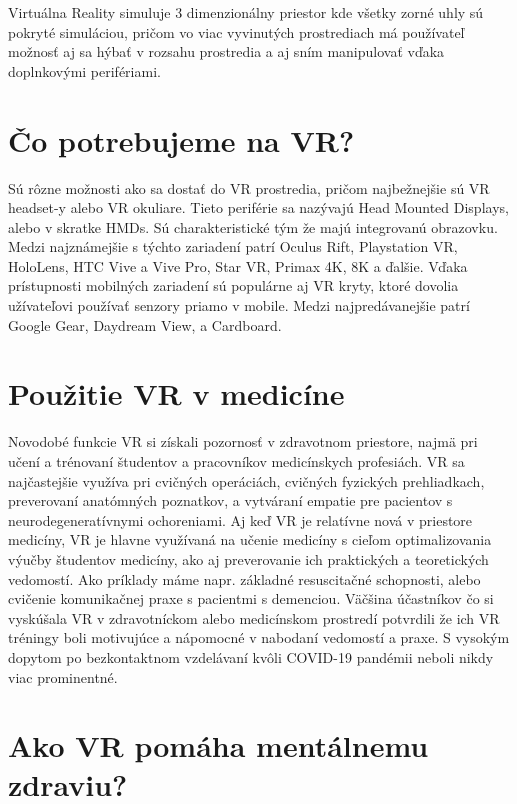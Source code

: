 \documentclass[10pt,twoside,slovak,a4paper]{article}
\begin{document}
Virtuálna Reality simuluje 3 dimenzionálny priestor kde všetky zorné uhly sú pokryté simuláciou, pričom vo viac vyvinutých prostrediach má používateľ možnosť aj sa hýbať v rozsahu prostredia a aj sním manipulovať vďaka doplnkovými perifériami.\cite{starkman}

\section{Čo potrebujeme na VR?} \label{Devices}

Sú rôzne možnosti ako sa dostať do VR prostredia, pričom najbežnejšie sú VR headset-y alebo VR okuliare.
Tieto periférie sa nazývajú Head Mounted Displays, alebo v skratke HMDs. Sú charakteristické tým že majú integrovanú obrazovku. Medzi najznámejšie s týchto zariadení patrí Oculus Rift, Playstation VR, HoloLens, HTC Vive a Vive Pro, Star VR, Primax 4K, 8K a ďalšie.
Vďaka prístupnosti mobilných zariadení sú populárne aj VR kryty, ktoré dovolia užívateľovi používať senzory priamo v mobile. Medzi najpredávanejšie patrí Google Gear, Daydream View, a Cardboard.

\section{Použitie VR v medicíne} \label{Usecase}

Novodobé funkcie VR si získali pozornosť v zdravotnom priestore, najmä pri učení a trénovaní študentov a pracovníkov medicínskych profesiách. VR sa najčastejšie využíva pri cvičných operáciách, cvičných fyzických prehliadkach, preverovaní anatómných poznatkov, a vytváraní empatie pre pacientov s neurodegeneratívnymi ochoreniami. Aj keď VR je relatívne nová v priestore medicíny, VR je hlavne využívaná na učenie medicíny s cieľom optimalizovania výučby študentov medicíny, ako aj preverovanie ich praktických a teoretických vedomostí. Ako príklady máme napr. základné resuscitačné schopnosti, alebo cvičenie komunikačnej praxe s pacientmi s demenciou. Väčšina účastníkov čo si vyskúšala VR v zdravotníckom alebo medicínskom prostredí potvrdili že ich VR tréningy boli motivujúce a nápomocné v nabodaní vedomostí a praxe. S vysokým dopytom po bezkontaktnom vzdelávaní kvôli COVID-19 pandémii neboli nikdy viac prominentné.
 
\section{Ako VR pomáha mentálnemu zdraviu?} \label{Mental}
\end{document}
